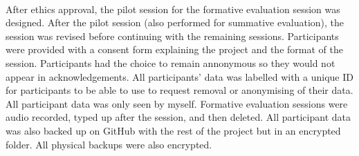 \paragraph{} After ethics approval, the pilot session for the formative evaluation session was designed. After the pilot session (also performed for summative evaluation), the session was revised before continuing with the remaining sessions. Participants were provided with a consent form explaining the project and the format of the session. Participants had the choice to remain annonymous so they would not appear in acknowledgements. All participants' data was labelled with a unique ID for participants to be able to use to request removal or anonymising of their data. All participant data was only seen by myself. Formative evaluation sessions were audio recorded, typed up after the session, and then deleted. All participant data was also backed up on GitHub with the rest of the project but in an encrypted folder. All physical backups were also encrypted.
